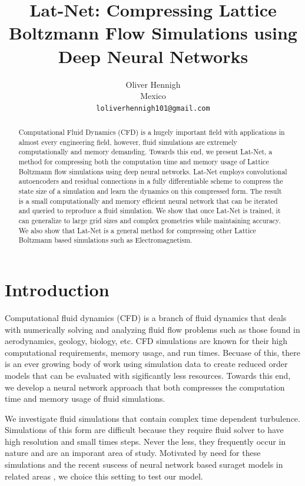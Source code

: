 \documentclass{article}
\title{Lat-Net: Compressing Lattice Boltzmann Flow Simulations using Deep Neural Networks}
\author{
  Oliver Hennigh \\
  Mexico \\
  \texttt{loliverhennigh101@gmail.com} \\
}
\begin{document}

\maketitle

\begin{abstract}
Computational Fluid Dynamics (CFD) is a hugely important field with applications in almost every engineering field, however, fluid simulations are extremely computationally and memory demanding. Towards this end, we present Lat-Net, a method for compressing both the computation time and memory usage of Lattice Boltzmann flow simulations using deep neural networks. Lat-Net employs convolutional autoencoders and residual connections in a fully differentiable scheme to compress the state size of a simulation and learn the dynamics on this compressed form. The result is a small computationally and memory efficient neural network that can be iterated and queried to reproduce a fluid simulation. We show that once Lat-Net is trained, it can generalize to large grid sizes and complex geometries while maintaining accuracy. We also show that Lat-Net is a general method for compressing other Lattice Boltzmann based simulations such as Electromagnetism.

\end{abstract}

\section{Introduction}

Computational fluid dynamics (CFD) is a branch of fluid dynamics that deals with numerically solving and analyzing fluid flow problems such as those found in aerodynamics, geology, biology, etc. CFD simulations are known for their high computational requirements, memory usage, and run times. Becuase of this, there is an ever growing body of work using simulation data to create reduced order models that can be evaluated with sigificantly less resources. Towards this end, we develop a neural network approach that both compresses the computation time and memory usage of fluid simulations.

We investigate fluid simulations that contain complex time dependent turbulence. Simulations of this form are difficult because they require fluid solver to have high resolution and small times steps. Never the less, they frequently occur in nature and are an imporant area of study. Motivated by need for these simulations and the recent suscess of neural network based suraget models in related areas \cite{tompson2016accelerating} \cite{guo2016convolutional}, we choice this setting to test our model.
\end{document}
